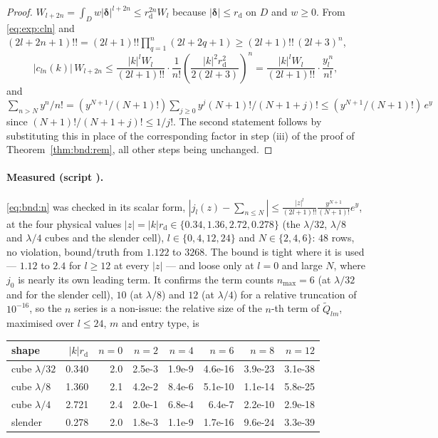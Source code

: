 \begin{proof}
$W_{l+2n} = \int_D w|\boldsymbol{\delta}|^{l+2n} \le r_{\mathrm{d}}^{2n}W_l$ because
$|\boldsymbol{\delta}| \le r_{\mathrm{d}}$ on $D$ and $w \ge 0$. From
\eqref{eq:exp:cln} and $(2l+2n+1)!! = (2l+1)!!\prod_{q=1}^{n}(2l+2q+1) \ge
(2l+1)!!\,(2l+3)^n$,
\[
|c_{ln}(k)|\,W_{l+2n} \le
\frac{|k|^{l}W_l}{(2l+1)!!}\cdot\frac{1}{n!}
\left(\frac{|k|^{2}r_{\mathrm{d}}^{2}}{2(2l+3)}\right)^{n}
= \frac{|k|^{l}W_l}{(2l+1)!!}\cdot\frac{y_l^{\,n}}{n!},
\]
and $\sum_{n>N}y^{n}/n! = (y^{N+1}/(N+1)!)\sum_{j\ge0}y^{j}(N+1)!/(N+1+j)! \le
(y^{N+1}/(N+1)!)\,e^{y}$ since $(N+1)!/(N+1+j)! \le 1/j!$. The second statement follows
by substituting this in place of the corresponding factor in step (iii) of the proof of
Theorem~\ref{thm:bnd:rem}, all other steps being unchanged.
\end{proof}

\paragraph{Measured (script ).} \eqref{eq:bnd:n} was checked in its
scalar form, $|j_l(z)-\sum_{n\le N}| \le \frac{|z|^{l}}{(2l+1)!!}
\frac{y^{N+1}}{(N+1)!}e^{y}$, at the four physical values
$|z| = |k|r_{\mathrm{d}} \in \{0.34, 1.36, 2.72, 0.278\}$ (the $\lambda/32$, $\lambda/8$
and $\lambda/4$ cubes and the slender cell), $l \in \{0,4,12,24\}$ and
$N \in \{2,4,6\}$: $48$ rows, no violation, bound/truth from $1.122$ to $3268$. The bound
is tight where it is used --- $1.12$ to $2.4$ for $l \ge 12$ at every $|z|$ --- and loose
only at $l = 0$ and large $N$, where $j_0$ is nearly its own leading term. It confirms the
term counts $n_{\max} = 6$ (at $\lambda/32$ and for the slender cell), $10$ (at
$\lambda/8$) and $12$ (at $\lambda/4$) for a relative truncation of $10^{-16}$, so the
$n$ series is a non-issue: the relative size of the $n$-th term of
$\widetilde{Q}_{lm}$, maximised over $l \le 24$, $m$ and entry type, is

\begin{center}\footnotesize
\begin{tabular}{@{}lrrrrrrr@{}}
\toprule
shape & $|k|r_{\mathrm{d}}$ & $n=0$ & $n=2$ & $n=4$ & $n=6$ & $n=8$ & $n=12$\\
\midrule
cube $\lambda/32$ & 0.340 & 2.0 & 2.5e-3 & 1.9e-9 & 4.6e-16 & 3.9e-23 & 3.1e-38\\
cube $\lambda/8$  & 1.360 & 2.1 & 4.2e-2 & 8.4e-6 & 5.1e-10 & 1.1e-14 & 5.8e-25\\
cube $\lambda/4$  & 2.721 & 2.4 & 2.0e-1 & 6.8e-4 & 6.4e-7  & 2.2e-10 & 2.9e-18\\
slender           & 0.278 & 2.0 & 1.8e-3 & 1.1e-9 & 1.7e-16 & 9.6e-24 & 3.3e-39\\
\bottomrule
\end{tabular}
\end{center}

